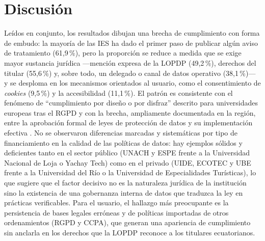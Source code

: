 \documentclass[11pt,a4paper]{article}
\begin{document}
\section{Discusi\'on}
Le\'idos en conjunto, los resultados dibujan una brecha de cumplimiento con forma de embudo: la mayor\'ia de las IES ha dado el primer paso de publicar alg\'un aviso de tratamiento (61,9\,\%), pero la proporci\'on se reduce a medida que se exige mayor sustancia jur\'idica ---menci\'on expresa de la LOPDP (49,2\,\%), derechos del titular (55,6\,\%) y, sobre todo, un delegado o canal de datos operativo (38,1\,\%)--- y se desploma en los mecanismos orientados al usuario, como el consentimiento de \emph{cookies} (9,5\,\%) y la accesibilidad (11,1\,\%).
El patr\'on es consistente con el fen\'omeno de ``cumplimiento por dise\~no o por disfraz'' descrito para universidades europeas tras el RGPD \citep{munot2025compliance} y con la brecha, ampliamente documentada en la regi\'on, entre la aprobaci\'on formal de leyes de protecci\'on de datos y su implementaci\'on efectiva \citep{carrillo2022follow,chavarriamora2025lack}.
No se observaron diferencias marcadas y sistem\'aticas por tipo de financiamiento en la calidad de las pol\'iticas de datos: hay ejemplos s\'olidos y deficientes tanto en el sector p\'ublico (UNACH y ESPE frente a la Universidad Nacional de Loja o Yachay Tech) como en el privado (UIDE, ECOTEC y UBE frente a la Universidad del R\'io o la Universidad de Especialidades Tur\'isticas), lo que sugiere que el factor decisivo no es la naturaleza jur\'idica de la instituci\'on sino la existencia de una gobernanza interna de datos que traduzca la ley en pr\'acticas verificables.
Para el usuario, el hallazgo m\'as preocupante es la persistencia de bases legales err\'oneas y de pol\'iticas importadas de otros ordenamientos (RGPD y CCPA), que generan una apariencia de cumplimiento sin anclarla en los derechos que la LOPDP reconoce a los titulares ecuatorianos.
\end{document}
